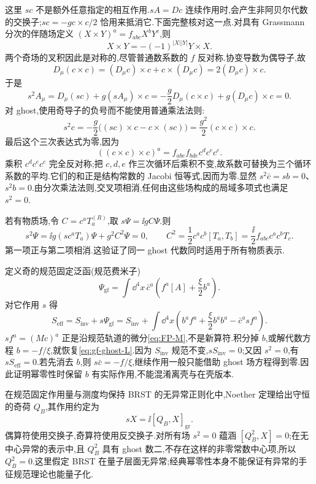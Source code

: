 这里 $sc$ 不是额外任意指定的相互作用.$sA=Dc$ 连续作用时,会产生非阿贝尔代数的交换子;$sc=-gc\times c/2$ 恰用来抵消它.下面完整核对这一点.对具有 Grassmann 分次的伴随场定义 $(X\times Y)^a=f_{abc}X^bY^c$,则
\[
 X\times Y=-(-1)^{|X||Y|}Y\times X.
\]
两个奇场的叉积因此是对称的,尽管普通数系数的 $f$ 反对称.协变导数为偶导子,故
\[
 D_\mu(c\times c)=(D_\mu c)\times c+c\times(D_\mu c)
 =2(D_\mu c)\times c.
\]
于是
\[
 s^2A_\mu=D_\mu(sc)+g(sA_\mu)\times c
 =-\frac g2D_\mu(c\times c)+g(D_\mu c)\times c=0.
\]
对 ghost,使用奇导子的负号而不能使用普通乘法法则:
\[
 s^2c=-\frac g2\bigl((sc)\times c-c\times(sc)\bigr)
 =\frac{g^2}{2}(c\times c)\times c.
\]
最后这个三次表达式为零,因为
\[
 ((c\times c)\times c)^a=f_{abc}f_{bde}c^dc^ec^c.
\]
乘积 $c^dc^ec^c$ 完全反对称;把 $c,d,e$ 作三次循环后乘积不变,故系数可替换为三个循环系数的平均.它们的和正是结构常数的 Jacobi 恒等式,因而为零.显然 $s^2\bar c=sb=0$、$s^2b=0$.由分次乘法法则,交叉项相消,任何由这些场构成的局域多项式也满足 $s^2=0$.

若有物质场,令 $C=c^aT_a^{(R)}$,取 $s\Psi=\ii gC\Psi$.则
\[
 s^2\Psi=\ii g(sc^aT_a)\Psi+g^2C^2\Psi=0,
 \qquad C^2=\frac12c^ac^b[T_a,T_b]=\frac\ii2 f_{abc}c^ac^bT_c.
\]
第一项正与第二项相消.这验证了同一 ghost 代数同时适用于所有物质表示.

定义奇的规范固定泛函(规范费米子)
\[
 \mathcal\Psi_{\mathrm{gf}}=\int\dd^4x\,\bar c^a
 \left(f^a[A]+\frac\xi2 b^a\right).
\]
对它作用 $s$ 得
\begin{equation}\label{eq:brst-exact-action}
 S_{\mathrm{eff}}=S_{\mathrm{inv}}+s\mathcal\Psi_{\mathrm{gf}}
 =S_{\mathrm{inv}}+\int\dd^4x\left(b^af^a+\frac\xi2 b^ab^a-\bar c^a s f^a\right).
\end{equation}
$s f^a=(Mc)^a$ 正是沿规范轨道的微分\eqref{eq:FP-M},不是新算符.积分掉 $b$,或解代数方程 $b=-f/\xi$,就恢复\eqref{eq:gf-ghost-L}.因为 $S_{\mathrm{inv}}$ 规范不变,$sS_{\mathrm{inv}}=0$;又因 $s^2=0$,有 $sS_{\mathrm{eff}}=0$.若先消去 $b$,则 $s\bar c=-f/\xi$,继续作用一般只能借助 ghost 场方程得到零.因此证明幂零性时保留 $b$ 有实际作用,不能混淆离壳与在壳版本.

在规范固定作用量与测度均保持 BRST 的无异常正则化中,Noether 定理给出守恒的奇荷 $Q_B$,其作用约定为
\[
 sX=\ii[Q_B,X]_{\mathrm{gr}}.
\]
偶算符使用交换子,奇算符使用反交换子.对所有场 $s^2=0$ 蕴涵 $[Q_B^2,X]=0$;在无中心异常的表示中,且 $Q_B^2$ 具有 ghost 数二,不存在这样的非零常数中心项,所以 $Q_B^2=0$.这里假定 BRST 在量子层面无异常;经典幂零性本身不能保证有异常的手征规范理论也能量子化.

